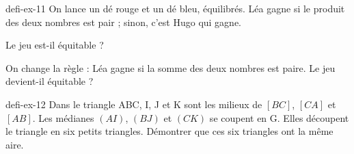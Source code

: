 \begin{blocEdition}{defi-ex-11}
On lance un dé rouge et un dé bleu, équilibrés. Léa gagne si le produit des deux nombres est pair ; sinon, c’est Hugo qui gagne.\begin{questions}\item Le jeu est-il équitable ?\item On change la règle : Léa gagne si la somme des deux nombres est paire. Le jeu devient-il équitable ?\end{questions}\label{fig-defi-11}
\par{}\par\par{}\par{}\par{}\par{}\par{}\par{}
\end{blocEdition}
\begin{blocEdition}{defi-ex-12}
Dans le triangle ABC, I, J et K sont les milieux de $[BC]$, $[CA]$ et $[AB]$. Les médianes $(AI)$, $(BJ)$ et $(CK)$ se coupent en G. Elles découpent le triangle en six petits triangles. Démontrer que ces six triangles ont la même aire.\label{fig-defi-12}
\par{}\par\par{}\par{}\par{}\par{}\par{}\par{}
\end{blocEdition}
